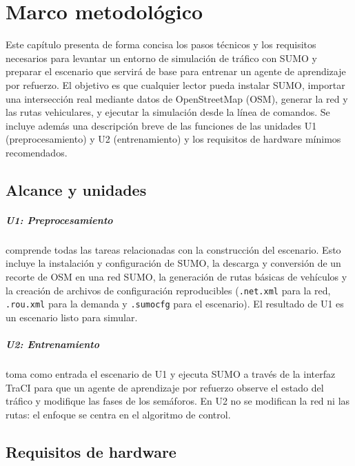 \graphicspath{{images/}}

\chapter{Marco metodológico}

Este capítulo presenta de forma concisa los pasos técnicos y los
requisitos necesarios para levantar un entorno de simulación de
tráfico con SUMO y preparar el escenario que servirá de base para
entrenar un agente de aprendizaje por refuerzo.  El objetivo es que
cualquier lector pueda instalar SUMO, importar una intersección real
mediante datos de OpenStreetMap (OSM), generar la red y las rutas
vehiculares, y ejecutar la simulación desde la línea de comandos.  Se
incluye además una descripción breve de las funciones de las unidades
U1 (preprocesamiento) y U2 (entrenamiento) y los requisitos de
hardware mínimos recomendados.

\section{Alcance y unidades}

\paragraph{U1: Preprocesamiento} comprende todas las tareas
relacionadas con la construcción del escenario.  Esto incluye la
instalación y configuración de SUMO, la descarga y conversión de un
recorte de OSM en una red SUMO, la generación de rutas básicas de
vehículos y la creación de archivos de configuración reproducibles
(\texttt{.net.xml} para la red, \texttt{.rou.xml} para la demanda y
\texttt{.sumocfg} para el escenario).  El resultado de U1 es un
escenario listo para simular.

\paragraph{U2: Entrenamiento} toma como entrada el escenario de
U1 y ejecuta SUMO a través de la interfaz TraCI para que un agente de
aprendizaje por refuerzo observe el estado del tráfico y modifique
las fases de los semáforos.  En U2 no se modifican la red ni las
rutas: el enfoque se centra en el algoritmo de control.

\section{Requisitos de hardware}


